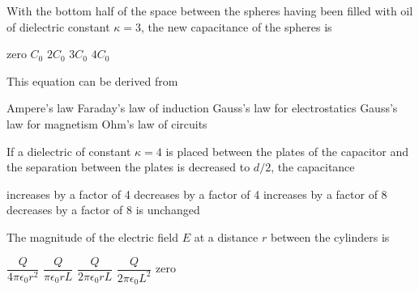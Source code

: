 \documentclass{../../oss-classkick-exam}
\begin{document}
\begin{multicols*}{2}
\begin{questions}
    \question With the bottom half of the space between the spheres having been
    filled with oil of dielectric constant $\kappa=3$, the new capacitance of
    the spheres is
    \label{cap2}
    \begin{choices}
      \choice zero
      \choice $C_0$
      \choice $2C_0$
      \choice $3C_0$
      \choice $4C_0$
    \end{choices}


    \question This equation can be derived from
    \begin{choices}
      \choice Ampere's law
      \choice Faraday's law of induction
      \choice Gauss's law for electrostatics
      \choice Gauss's law for magnetism
      \choice Ohm's law of circuits
    \end{choices}
    \label{plate1}
    
    \question If a dielectric of constant $\kappa=4$ is placed between the
    plates of the capacitor and the separation between the plates is decreased
    to $d/2$, the capacitance
    \begin{choices}
      \choice increases by a factor of 4
      \choice decreases by a factor of 4
      \choice increases by a factor of 8
      \choice decreases by a factor of 8
      \choice is unchanged
    \end{choices}
    \label{plate2}
    \columnbreak
    

    \question The magnitude of the electric field $E$ at a distance $r$ between
    the cylinders is
    \begin{choices}
      \choice $\dfrac Q{4\pi\epsilon_0r^2}$
      \choice $\dfrac Q{\pi\epsilon_0rL}$
      \choice $\dfrac Q{2\pi\epsilon_0rL}$
      \choice $\dfrac Q{2\pi\epsilon_0L^2}$
      \choice zero
    \end{choices}
    \label{cyl1}


\end{questions}
\end{multicols*}
\end{document}
